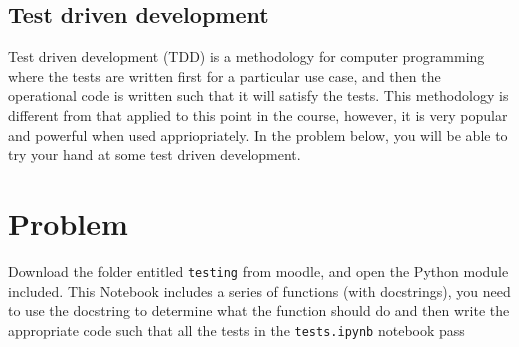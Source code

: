 \documentclass[a4paper]{article}
\begin{document}
\vspace{\baselineskip}
\begin{center}
	\noindent{}
\end{center}

\subsection{Test driven development}
Test driven development (TDD) is a methodology for computer programming where the tests are written first for a particular use case, and then the operational code is written such that it will satisfy the tests.
This methodology is different from that applied to this point in the course, however, it is very popular and powerful when used appriopriately.
In the problem below, you will be able to try your hand at some test driven development.

\section{Problem}
Download the folder entitled \texttt{testing} from moodle, and open the Python module included.
This Notebook includes a series of functions (with docstrings), you need to use the docstring to determine what the function should do and then write the appropriate code such that all the tests in the \texttt{tests.ipynb} notebook pass

%
%
\end{document}
